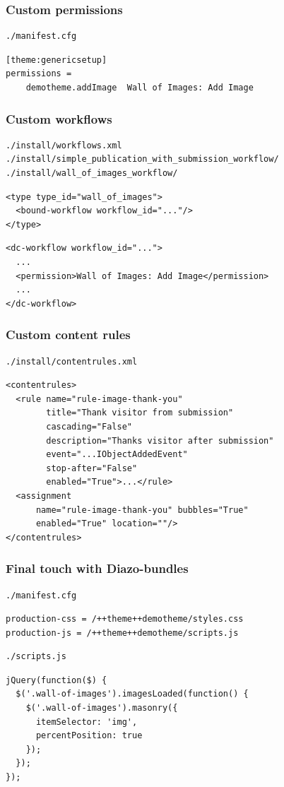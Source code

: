 \documentclass[aspectratio=43]{beamer}
\begin{document}
\begin{frame}
\frametitle{Custom permissions}
\begin{verbatim}
./manifest.cfg
\end{verbatim}
\begin{verbatim}
[theme:genericsetup]
permissions =
    demotheme.addImage  Wall of Images: Add Image
\end{verbatim}
\end{frame}

\begin{frame}
\frametitle{Custom workflows}
\begin{verbatim}
./install/workflows.xml
./install/simple_publication_with_submission_workflow/
./install/wall_of_images_workflow/
\end{verbatim}
\begin{verbatim}
<type type_id="wall_of_images">
  <bound-workflow workflow_id="..."/>
</type>
\end{verbatim}
\begin{verbatim}
<dc-workflow workflow_id="...">
  ...
  <permission>Wall of Images: Add Image</permission>
  ...
</dc-workflow>
\end{verbatim}
\end{frame}

\begin{frame}
\frametitle{Custom content rules}
\begin{verbatim}
./install/contentrules.xml
\end{verbatim}
\begin{verbatim}
<contentrules>
  <rule name="rule-image-thank-you"
        title="Thank visitor from submission"
        cascading="False"
        description="Thanks visitor after submission"
        event="...IObjectAddedEvent"
        stop-after="False"
        enabled="True">...</rule>
  <assignment
      name="rule-image-thank-you" bubbles="True"
      enabled="True" location=""/>
</contentrules>
\end{verbatim}
\end{frame}

\begin{frame}
\frametitle{Final touch with Diazo-bundles}
\begin{verbatim}
./manifest.cfg
\end{verbatim}
\begin{verbatim}
production-css = /++theme++demotheme/styles.css
production-js = /++theme++demotheme/scripts.js
\end{verbatim}
\begin{verbatim}
./scripts.js
\end{verbatim}
\begin{verbatim}
jQuery(function($) {
  $('.wall-of-images').imagesLoaded(function() {
    $('.wall-of-images').masonry({
      itemSelector: 'img',
      percentPosition: true
    });
  });
});
\end{verbatim}
\end{frame}
\end{document}
